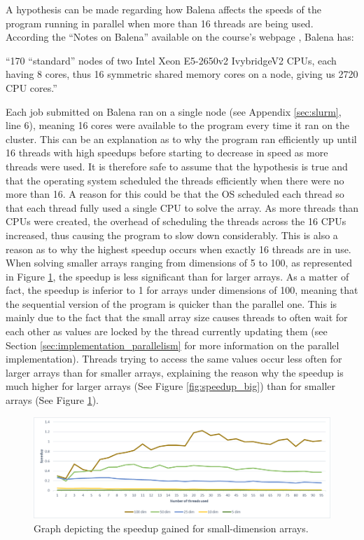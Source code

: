 \documentclass[letterpaper,12pt]{article}
\begin{document}
A hypothesis can be made regarding how Balena affects the speeds of the program running in parallel when more than 16 threads are being used. According the ``Notes on Balena'' available on the course's webpage \cite{balena_notes}, Balena has: 
\begin{displayquote}
``170 “standard” nodes of two Intel Xeon E5-2650v2 IvybridgeV2 CPUs, each having 8 cores, thus 16 symmetric shared memory cores on a node, giving us 2720 CPU cores.''
\end{displayquote} 
Each job submitted on Balena ran on a single node (see Appendix \ref{sec:slurm}, line 6), meaning 16 cores were available to the program every time it ran on the cluster. This can be an explanation as to why the program ran efficiently up until 16 threads with high speedups before starting to decrease in speed as more threads were used. It is therefore safe to assume that the hypothesis is true and that the operating system scheduled the threads efficiently when there were no more than 16. A reason for this could be that the OS scheduled each thread so that each thread fully used a single CPU to solve the array. As more threads than CPUs were created, the overhead of scheduling the threads across the 16 CPUs increased, thus causing the program to slow down considerably. This is also a reason as to why the highest speedup occurs when exactly 16 threads are in use.\\

When solving smaller arrays ranging from dimensions of 5 to 100, as represented in Figure \ref{fig:speedup_small}, the speedup is less significant than for larger arrays. As a matter of fact, the speedup is inferior to 1 for arrays under dimensions of 100, meaning that the sequential version of the program is quicker than the parallel one. This is mainly due to the fact that the small array size causes threads to often wait for each other as values are locked by the thread currently updating them (see Section \ref{sec:implementation_parallelism} for more information on the parallel implementation). Threads trying to access the same values occur less often for larger arrays than for smaller arrays, explaining the reason why the speedup is much higher for larger arrays (See Figure \ref{fig:speedup_big}) than for smaller arrays (See Figure \ref{fig:speedup_small}).\\

\begin{figure}[h]
\centerline{\includegraphics[width=\textwidth]{report/plots/speedup_small.png}}
\caption{\label{fig:speedup_small}Graph depicting the speedup gained for small-dimension arrays.}
\end{figure}
\end{document}
